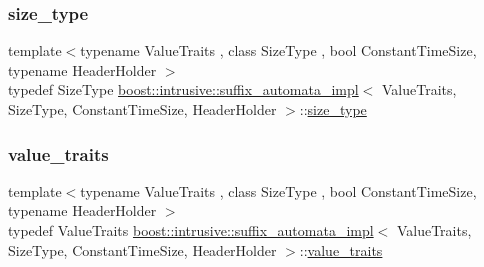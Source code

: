 \subsubsection{\texorpdfstring{size\+\_\+type}{size\_type}}
{\footnotesize\ttfamily template$<$typename Value\+Traits , class Size\+Type , bool Constant\+Time\+Size, typename Header\+Holder $>$ \\
typedef Size\+Type \hyperlink{classboost_1_1intrusive_1_1suffix__automata__impl}{boost\+::intrusive\+::suffix\+\_\+automata\+\_\+impl}$<$ Value\+Traits, Size\+Type, Constant\+Time\+Size, Header\+Holder $>$\+::\hyperlink{classboost_1_1intrusive_1_1suffix__automata__impl_ad2fe9bd542f914c94c7d0e42cce5613c}{size\+\_\+type}}

\mbox{\label{classboost_1_1intrusive_1_1suffix__automata__impl_abbf3dee8caf18613db903931801c6076}} 
\subsubsection{\texorpdfstring{value\+\_\+traits}{value\_traits}}
{\footnotesize\ttfamily template$<$typename Value\+Traits , class Size\+Type , bool Constant\+Time\+Size, typename Header\+Holder $>$ \\
typedef Value\+Traits \hyperlink{classboost_1_1intrusive_1_1suffix__automata__impl}{boost\+::intrusive\+::suffix\+\_\+automata\+\_\+impl}$<$ Value\+Traits, Size\+Type, Constant\+Time\+Size, Header\+Holder $>$\+::\hyperlink{classboost_1_1intrusive_1_1suffix__automata__impl_abbf3dee8caf18613db903931801c6076}{value\+\_\+traits}}

\mbox{\label{classboost_1_1intrusive_1_1suffix__automata__impl_afc35e3e13adbae16ac9bfb049d719cd2}} 
